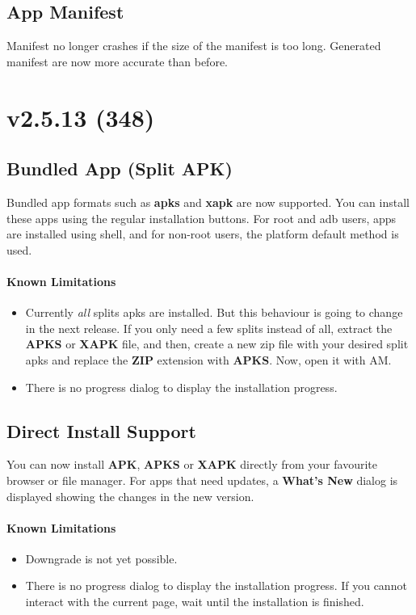 \subsection{App Manifest}
Manifest no longer crashes if the size of the manifest is too long. Generated manifest are now more accurate than before.


\section{v2.5.13 (348)}

\subsection{Bundled App (Split APK)}
Bundled app formats such as \textbf{apks} and \textbf{xapk} are now supported. You can install these apps using
the regular installation buttons. For root and adb users, apps are installed using shell, and for non-root users,
the platform default method is used.

\paragraph{Known Limitations}
\begin{itemize}
    \item Currently \textit{all} splits apks are installed. But this behaviour is going to change in the next release.
    If you only need a few splits instead of all, extract the \textbf{APKS} or \textbf{XAPK} file, and then, create a new zip
    file with your desired split apks and replace the \textbf{ZIP} extension with \textbf{APKS}. Now, open it with AM.
    \item There is no progress dialog to display the installation progress.
\end{itemize}

\subsection{Direct Install Support}
You can now install \textbf{APK}, \textbf{APKS} or \textbf{XAPK} directly from your favourite browser or file manager.
For apps that need updates, a \textbf{What's New} dialog is displayed showing the changes in the new version.

\paragraph{Known Limitations}
\begin{itemize}
    \item Downgrade is not yet possible.
    \item There is no progress dialog to display the installation progress. If you cannot interact with the current page,
    wait until the installation is finished.
\end{itemize}

